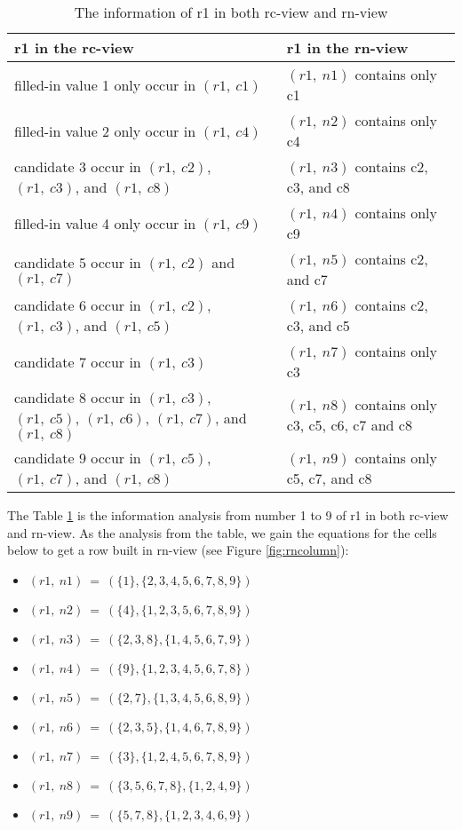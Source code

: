 \documentclass[11pt]{report}
\newcommand{\set}[1]{\{ #1 \}}
\begin{document}
\begin{table}
\begin{center}
  \begin{tabular}{|p{7cm}|p{7cm}|}
    \hline
    \textbf{r1 in the rc-view} & \textbf{r1 in the rn-view} \\ \hline
    filled-in value 1 only occur in $(r1,\ c1)$ & $(r1,\ n1)$ contains only c1\\ \hline
    filled-in value 2 only occur in $(r1,\ c4)$ & $(r1,\ n2)$ contains only c4 \\ \hline
    candidate 3 occur in $(r1,\ c2)$,  $(r1,\ c3)$, and $(r1,\ c8)$ & $(r1,\ n3)$ contains c2, c3, and c8 \\ \hline
    filled-in value 4 only occur in $(r1,\ c9)$ & $(r1,\ n4)$ contains only c9 \\ \hline
    candidate 5 occur in $(r1,\ c2)$ and $(r1,\ c7)$ & $(r1,\ n5)$ contains c2, and c7 \\ \hline
    candidate 6 occur in $(r1,\ c2)$,  $(r1,\ c3)$, and $(r1,\ c5)$ & $(r1,\ n6)$ contains c2, c3, and c5 \\ \hline
    candidate 7 occur in $(r1,\ c3)$ & $(r1,\ n7)$ contains only c3 \\ \hline
    candidate 8 occur in $(r1,\ c3)$,  $(r1,\ c5)$,  $(r1,\ c6)$,  $(r1,\ c7)$, and $(r1,\ c8)$ & $(r1,\ n8)$ contains only c3, c5, c6, c7 and c8 \\ \hline
    candidate 9 occur in $(r1,\ c5)$, $(r1,\ c7)$, and  $(r1,\ c8)$ & $(r1,\ n9)$ contains only c5, c7, and c8 \\ \hline
  \end{tabular}
\end{center}
\caption{The information of r1 in both rc-view and rn-view}
\label{tab:rcandrn}
\end{table}

The Table \ref{tab:rcandrn} is the information analysis from number 1 to 9 of r1 in both rc-view and rn-view. As the analysis from the table, we gain the equations for the cells below to get a row built in rn-view (see Figure \ref{fig:rncolumn}):
\begin{itemize}
\item $(r1,\ n1)\ =\ (\set{1}, \set{2, 3, 4, 5, 6, 7, 8, 9})$
\item $(r1,\ n2)\ =\ (\set{4}, \set{1, 2, 3, 5, 6, 7, 8, 9})$
\item $(r1,\ n3)\ =\ (\set{2, 3, 8}, \set{1, 4, 5, 6, 7, 9})$
\item $(r1,\ n4)\ =\ (\set{9}, \set{1, 2, 3, 4, 5, 6, 7, 8})$
\item $(r1,\ n5)\ =\ (\set{2, 7}, \set{1, 3, 4, 5, 6, 8, 9})$
\item $(r1,\ n6)\ =\ (\set{2, 3, 5}, \set{1, 4, 6, 7, 8, 9})$
\item $(r1,\ n7)\ =\ (\set{3}, \set{1, 2, 4, 5, 6, 7, 8, 9})$
\item $(r1,\ n8)\ =\ (\set{3, 5, 6, 7, 8}, \set{1, 2, 4, 9})$
\item $(r1,\ n9)\ =\ (\set{5, 7, 8}, \set{1, 2, 3, 4, 6, 9})$
\end{itemize}
\end{document}
